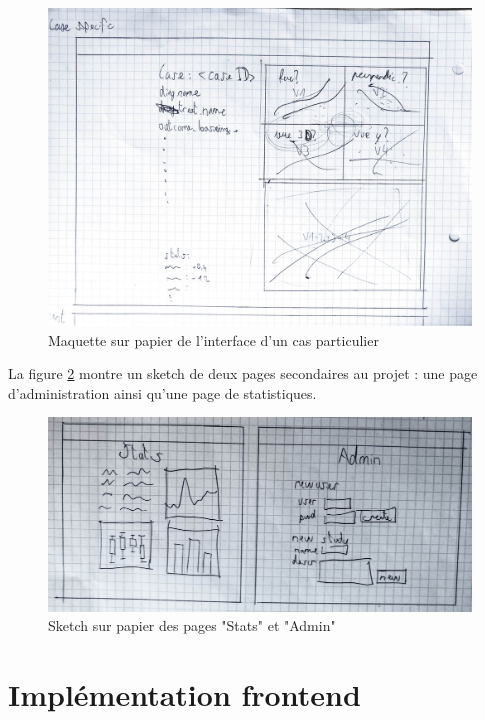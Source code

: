 		\begin{figure}[!h]
			\centering
			\includegraphics[width=1\textwidth]{images/analyse/maquette2}
			\caption{Maquette sur papier de l'interface d'un cas particulier}
			\label{maquette_papier2}
		\end{figure}

		La figure \ref{maquette_papier3} montre un sketch de deux pages secondaires au projet : une page d'administration ainsi qu'une page de statistiques.

		\begin{figure}[!h]
			\centering
			\includegraphics[width=1\textwidth]{images/analyse/maquette3}
			\caption{Sketch sur papier des pages "Stats" et "Admin"}
			\label{maquette_papier3}
		\end{figure}

\section{Implémentation frontend}

